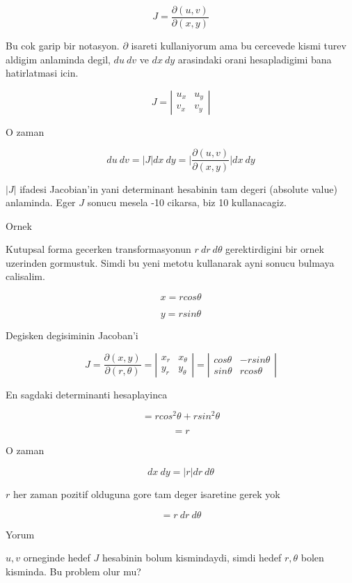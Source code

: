 \documentclass[12pt,fleqn]{article}
\begin{document}
\[ J = \frac{\partial (u,v)}{\partial(x,y)} \]

Bu cok garip bir notasyon. $\partial$ isareti kullaniyorum ama bu cercevede
kismi turev aldigim anlaminda degil, $du \ dv$ ve $dx \ dy$ arasindaki
orani hesapladigimi bana hatirlatmasi icin. 

\[ J =  \left|\begin{array}{rr}
u_x & u_y \\
v_x & v_y
\end{array}\right|
\]

O zaman 

\[ du \ dv = 
|J| dx \ dy = 
\bigg|\frac{\partial (u,v)}{\partial(x,y)}\bigg| dx \ dy
 \]

$|J|$ ifadesi Jacobian'in yani determinant hesabinin tam degeri (absolute
value) anlaminda. Eger $J$ sonucu mesela -10 cikarsa, biz 10 kullanacagiz. 

Ornek 

Kutupsal forma gecerken transformasyonun $r \ dr \ d\theta$ gerektirdigini
bir ornek uzerinden gormustuk. Simdi bu yeni metotu kullanarak ayni sonucu
bulmaya calisalim. 

\[  x= r cos\theta \]

\[  y= r sin\theta \]

Degisken degisiminin Jacoban'i

\[ J = \frac{\partial (x,y)}{\partial(r,\theta)}  =
\left|\begin{array}{rr}
x_r & x_\theta \\
y_r & y_\theta
\end{array}\right|   =
\left|\begin{array}{rr}
cos\theta & -rsin\theta\\
sin\theta & rcos\theta
\end{array}\right|
\]

En sagdaki determinanti hesaplayinca

\[ = rcos^2\theta + rsin^2\theta \]

\[ = r \]

O zaman 

\[ dx \ dy = |r| dr \ d\theta \]

$r$ her zaman pozitif olduguna gore tam deger isaretine gerek yok

\[ = r \ dr \ d\theta\]

Yorum 

$u,v$ orneginde hedef $J$ hesabinin bolum kismindaydi, simdi hedef
$r,\theta$ bolen kisminda. Bu problem olur mu? 
\end{document}
